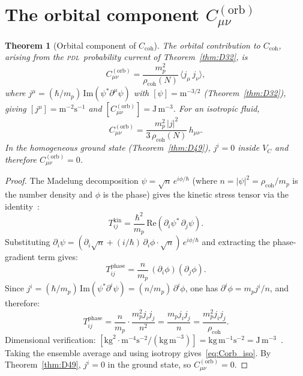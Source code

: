 \documentclass[12pt,a4paper]{article}
\newtheorem{theorem}{Theorem}[section]
\newcommand{\hb}{\hbar}
\newcommand{\PDL}{\textsc{pdl}}
\newcommand{\Ccoh}{C_{\mathrm{coh}}}
\newcommand{\Corb}{C^{(\mathrm{orb})}}
\newcommand{\rhocoh}{\rho_{\mathrm{coh}}}
\newcommand{\VC}{V_C}
\begin{document}
\section{The orbital component \texorpdfstring{$\Corb_{\mu\nu}$}{C(orb)}}
\label{sec:Corb}

\begin{theorem}[Orbital component of $\Ccoh$]
\label{thm:Corb}
The orbital contribution to $\Ccoh$, arising from the \PDL\ probability current of Theorem~\ref{thm:D32}, is
\begin{equation}
\Corb_{\mu\nu} = \frac{m_p^2}{\rhocoh(N)}\,\bigl\langle j_\mu\,j_\nu\bigr\rangle,
\label{eq:Corb}
\end{equation}
where $j^\mu = (\hb/m_p)\,\mathrm{Im}(\psi^*\partial^\mu\psi)$ with $[\psi] = \mathrm{m}^{-3/2}$ (Theorem~\ref{thm:D32}), giving $[j^\mu] = \mathrm{m}^{-2}\mathrm{s}^{-1}$ and $[\Corb_{\mu\nu}] = \mathrm{J\,m^{-3}}$. For an isotropic fluid,
\begin{equation}
\Corb_{\mu\nu} = \frac{m_p^2\,|j|^2}{3\,\rhocoh(N)}\,h_{\mu\nu}.
\label{eq:Corb_iso}
\end{equation}
In the homogeneous ground state (Theorem~\ref{thm:D49}), $j^i = 0$ inside $\VC$ and therefore $\Corb_{\mu\nu} = 0$.
\end{theorem}

\begin{proof}
The Madelung decomposition $\psi = \sqrt{n}\,e^{i\phi/\hb}$ (where $n = |\psi|^2 = \rhocoh/m_p$ is the number density and $\phi$ is the phase) gives the kinetic stress tensor via the identity~\cite{Misner_1973}:
\begin{equation}
T_{ij}^{\mathrm{kin}} = \frac{\hb^2}{m_p}\,\mathrm{Re}(\partial_i\psi^*\,\partial_j\psi).
\end{equation}
Substituting $\partial_i\psi = (\partial_i\sqrt{n} + (i/\hb)\,\partial_i\phi\cdot\sqrt{n})\,e^{i\phi/\hb}$ and extracting the phase-gradient term gives:
\begin{equation}
T_{ij}^{\mathrm{phase}} = \frac{n}{m_p}\,(\partial_i\phi)(\partial_j\phi).
\end{equation}
Since $j^i = (\hb/m_p)\,\mathrm{Im}(\psi^*\partial^i\psi) = (n/m_p)\,\partial^i\phi$, one has $\partial^i\phi = m_p j^i/n$, and therefore:
\begin{equation}
T_{ij}^{\mathrm{phase}} = \frac{n}{m_p}\cdot\frac{m_p^2 j_i j_j}{n^2} = \frac{m_p j_i j_j}{n} = \frac{m_p^2 j_i j_j}{\rhocoh}.
\end{equation}
Dimensional verification: $[\mathrm{kg}^2\cdot\mathrm{m}^{-4}\mathrm{s}^{-2}/(\mathrm{kg\,m}^{-3})] = \mathrm{kg\,m^{-1}s^{-2}} = \mathrm{J\,m^{-3}}$~\checkmark. Taking the ensemble average and using isotropy gives~\eqref{eq:Corb_iso}. By Theorem~\ref{thm:D49}, $j^i = 0$ in the ground state, so $\Corb_{\mu\nu} = 0$.
\end{proof}
\end{document}
